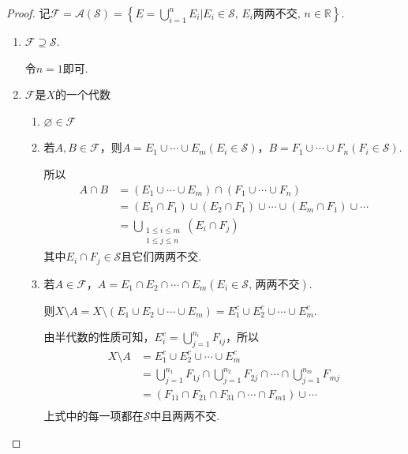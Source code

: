 \documentclass[lang=cn,a4paper,11pt,openany,scheme=chinese,twoside]{elegantbook}
\begin{document}
\begin{proof}
    记$\mathcal{F}=\mathcal{A}(\mathcal{S})=\left\{E=\bigcup_{i=1}^n{E_i}\bigg| E_i\in\mathcal{S},\,E_i\text{两两不交},\,n\in\mathbb{R} \right\}$.\par
    \begin{enumerate}[label=(\arabic*)]
        \item $\mathcal{F}\supseteq\mathcal{S}$.\par
        令$n=1$即可.
        \item $\mathcal{F}$是$X$的一个代数
        \begin{enumerate}[label=(\roman*)]
            \item $\varnothing\in\mathcal{F}$
            \item 若$A,B\in\mathcal{F}$，则$A=E_1\cup\cdots\cup E_m(E_i\in\mathcal{S})$，$B=F_1\cup\cdots\cup F_n (F_i\in\mathcal{S})$.\par
            所以
            {\setlength{\jot}{-2pt}\begin{align*}
                A\cap B&=(E_1\cup\cdots\cup E_m)\cap(F_1\cup\cdots\cup F_n)\\
                &=(E_1\cap F_1)\cup(E_2\cap F_1)\cup\cdots\cup (E_m\cap F_1)\cup\cdots\\
                &=\bigcup_{\substack{1\leqslant i\leqslant m\\ 1\leqslant j\leqslant n}}(E_i\cap F_j)
            \end{align*}}
            其中$E_i\cap F_j\in\mathcal{S}$且它们两两不交.
            \item 若$A\in\mathcal{F}$，$A=E_1\cap E_2\cap\cdots\cap E_m(E_i\in\mathcal{S},\,\text{两两不交})$.\par
            则$X\setminus A = X\setminus (E_1\cup E_2\cup\cdots\cup E_m)=E_1^c\cup E_2^c\cup\cdots\cup E_m^c$.\par
            由半代数的性质可知，$E_i^c=\bigcup_{j=1}^{n_i}{F_{ij}}$，所以
            {\setlength{\jot}{-2pt}\setlength\belowdisplayskip{-10pt}\begin{align*}
                X\setminus A&=E_1^c\cup E_2^c\cup\cdots\cup E_m^c\\
                &=\bigcup_{j=1}^{n_1}{F_{1j}}\cap\bigcup_{j=1}^{n_2}{F_{2j}}\cap\cdots\cap\bigcup_{j=1}^{n_m}{F_{mj}} \\
                &=(F_{11}\cap F_{21}\cap F_{31}\cap\cdots\cap F_{m1})\cup\cdots \\
            \end{align*}}
            上式中的每一项都在$\mathcal{S}$中且两两不交.

\end{enumerate}
\end{enumerate}
\end{proof}
\end{document}
